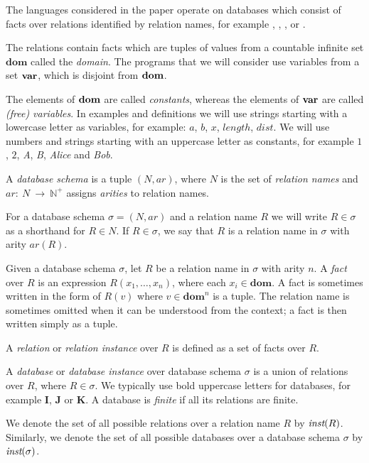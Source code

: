 The languages considered in the paper operate on databases which consist of facts over relations identified by relation names, for example , , ,  or .

The relations contain facts which are tuples of values from a countable infinite set $\textbf{dom}$ called the \emph{domain}. The programs that we will consider use variables from a set $\bf{var}$, which is disjoint from $\bf{dom}$. 

The elements of $\bf{dom}$ are called \emph{constants}, whereas the elements of $\bf{var}$ are called \emph{(free) variables}.
In examples and definitions we will use strings starting with a lowercase letter as variables, for example: $a$, $b$, $x$, $length$, $dist$. We will use numbers and strings starting with an uppercase letter as constants, for example $1$, $2$, \textit{A}, \textit{B}, \textit{Alice} and \textit{Bob}.

\begin{defn}

A \emph{database schema} is a tuple $(N, ar)$, where $N$ is the set of \emph{relation names} and $ar:~N~\to~\mathbb{N}^+$ assigns \emph{arities} to relation names. 

For a database schema $\sigma = (N, ar)$ and a relation name $R$ we will write $R \in \sigma$ as a shorthand for $R \in N$. If $R \in \sigma$, we say that $R$ is a relation name in $\sigma$ with arity $ar(R)$.

Given a database schema $\sigma$, let $R$ be a relation name in $\sigma$ with arity $n$. A \emph{fact} over $R$ is an expression $R(x_1 , \dots , x_n)$, where each $x_i \in \textbf{dom}$. A fact is sometimes written in the form of $R(v)$ where $v \in \textbf{dom}^n$ is a tuple. The relation name is sometimes omitted when it can be understood from the context; a fact is then written simply as a tuple.

A \emph{relation} or \emph{relation instance} over $R$ is defined as a set of facts over $R$.

A \emph{database} or \emph{database instance} over database schema $\sigma$ is a union of relations over $R$, where $R \in \sigma$. We typically use bold uppercase letters for databases, for example $\textbf{I}$, $\textbf{J}$ or $\textbf{K}$. A database is \emph{finite} if all its relations are finite.

We denote the set of all possible relations over a relation name $R$ by $\textit{inst}(R)$. Similarly, we denote the set of all possible databases over a database schema $\sigma$ by $\textit{inst}(\sigma)$.
\end{defn}

